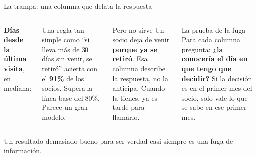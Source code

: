 \documentclass[aspectratio=169,11pt]{beamer}
\begin{document}
\begin{frame}[t]{La trampa: una columna que delata la respuesta}
  \begin{columns}[T,onlytextwidth]
    \small
    \textbf{Días desde la última visita}, en mediana:
    \vspace{0.1cm}

    \vspace{0.1cm}

    \footnotesize Una regla tan simple como ``si lleva más de 30 días sin
    venir, se retiró'' acierta con el \textbf{91\%} de los socios. Supera
    la línea base del 80\%. Parece un gran modelo.
    \begin{alertblock}{Pero no sirve}
      \footnotesize Un socio deja de venir \textbf{porque ya se retiró}. Esa
      columna describe la respuesta, no la anticipa. Cuando la tienes, ya
      es tarde para llamarlo.
    \end{alertblock}
    \begin{exampleblock}{La prueba de la fuga}
      \footnotesize Para cada columna pregunta: \textbf{¿la conocería el
      día en que tengo que decidir?} Si la decisión es en el primer mes
      del socio, solo vale lo que se sabe en ese primer mes.
    \end{exampleblock}
  \end{columns}
  \vspace{0.1cm}
  \footnotesize Un resultado demasiado bueno para ser verdad casi siempre es
  una fuga de información.
\end{frame}
\end{document}
